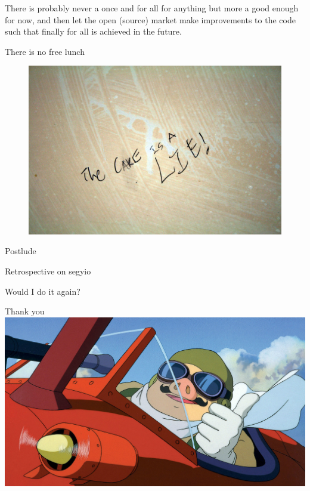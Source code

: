 \documentclass[pdf]{beamer}
\begin{document}
\begin{frame}
    \begin{displayquote}
        There is probably never a once and for all for anything but more a good
        enough for now, and then let the open (source) market make improvements
        to the code such that finally for all is achieved in the future.
    \end{displayquote}
\end{frame}

\begin{frame}
    \begin{center}
        There is no free lunch
    \end{center}
    \begin{figure}
        \includegraphics[width=\textwidth, keepaspectratio]{img/cake}
    \end{figure}
\end{frame}

\begin{frame}
    \begin{center}
        Postlude
    \end{center}
\end{frame}

\begin{frame}
    Retrospective on segyio
\end{frame}

\begin{frame}
    Would I do it again?
\end{frame}

\begin{frame}{Thank you}
    \includegraphics[width = \textwidth]{img/porcorosso}
\end{frame}
\end{document}
